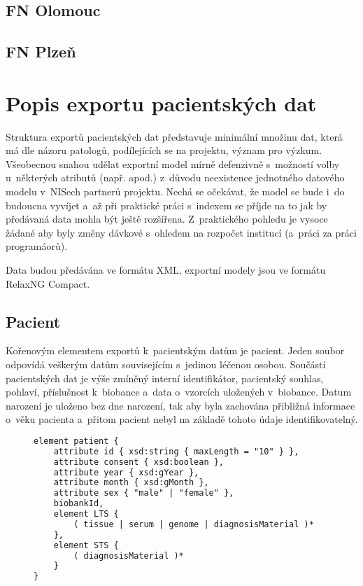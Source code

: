 \subsection{FN Olomouc}

\subsection{FN Plzeň}



\section{Popis exportu pacientských dat}
Struktura exportů pacientských dat představuje minimální množinu dat, která má dle názoru patologů, podílejících se na projektu, význam pro výzkum. Všeobecnou snahou udělat exportní model mírně defenzivně s~možností volby u~některých atributů (např.  apod.) z~důvodu neexistence jednotného datového modelu v~NISech partnerů projektu. Nechá se očekávat, že model se bude i~do budoucna vyvíjet a~až při praktické práci s~indexem se příjde na to jak by předávaná data mohla být ještě rozšířena. Z~praktického pohledu je vysoce žádané aby byly změny dávkové s~ohledem na rozpočet institucí (a~práci za práci programáorů).

Data budou předávána ve formátu XML, exportní modely jsou ve formátu RelaxNG Compact.

\subsection{Pacient}
Kořenovým elementem exportů k~pacientským datům je pacient. Jeden soubor odpovídá veškerým datům souvisejícím s~jedinou léčenou osobou. Součástí pacientských dat je výše zmíněný interní identifikátor, pacientský souhlas, pohlaví, příslušnost k~biobance a~data o~vzorcích uložených v~biobance. Datum narození je uloženo bez dne narození, tak aby byla zachována přibližná informace o~věku pacienta a~přitom pacient nebyl na základě tohoto údaje identifikovatelný.

\begin{figure}[htp]
\begin{center}
\begin{lstlisting}[language=XML, caption={Element pacienta v~exportním schéma.}]
element patient {		
	attribute id { xsd:string { maxLength = "10" } },		
	attribute consent { xsd:boolean },   
	attribute year { xsd:gYear },	  
	attribute month { xsd:gMonth },   
	attribute sex { "male" | "female" },	  
	biobankId,		
	element LTS {
		( tissue | serum | genome | diagnosisMaterial )*
	},		
	element STS {
		( diagnosisMaterial )*
	}
}
\end{lstlisting}
\end{center}
\label{fig:export:data:patient}
\end{figure}

